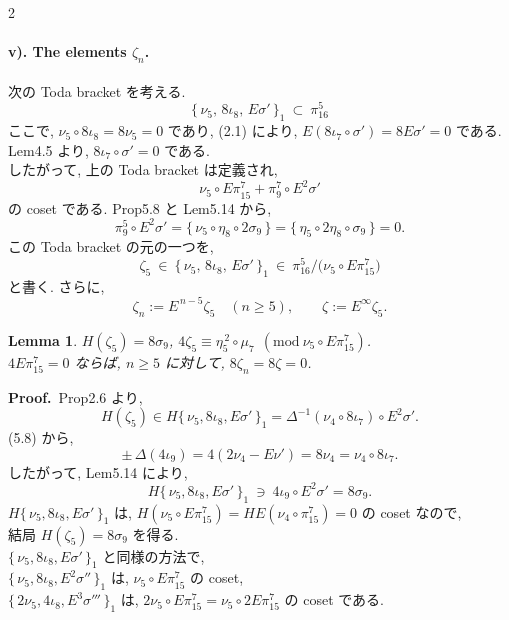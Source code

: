 \documentclass[10pt, leqno]{ltjsarticle}
\newcommand{\todai}[2][]{\{\,#2\,\}_{#1}}      %
\newcommand{\gen}[1]{\{\,#1\,\}}       %
\newcommand{\pit}[2]{\pi_{#1}^{#2}}
\numberwithin{equation}{section}
\theoremstyle{plain}
\newtheorem{lemma}[theorem]{Lemma}
\theoremstyle{definition}
\theoremstyle{remark}
\begin{document}
\begin{paracol}{2}

\paragraph{v). The elements \(\zeta_{n}\).}

次の Toda bracket を考える. 
\[
\todai[1]{\nu_{5},\,8\iota_{8},\,E\sigma'}
\ \subset\ \pi^{5}_{16}
\]
ここで, \(\nu_{5}\circ 8\iota_{8}=8\nu_{5}=0\) であり, 
(2.1) により, 
\(E(8\iota_{7}\circ \sigma')=8E\sigma'=0\) である. \\
Lem4.5 より, \(8\iota_{7}\circ \sigma'=0\) である. \\
したがって, 上の Toda bracket は定義され,
\[
\nu_{5}\circ E\pi^{7}_{15}+\pi^{7}_{9}\circ E^{2}\sigma'
\] 
の coset である. 
Prop5.8 と Lem5.14 から,
\[
\pi^{5}_{9}\circ E^{2}\sigma'
=\gen{\nu_{5}\circ \eta_{8}\circ 2\sigma_{9}}
=\gen{\eta_{5}\circ 2\eta_{8}\circ \sigma_{9}} = 0 .
\]
この Toda bracket の元の一つを,
\[
\zeta_{5}\ \in\ \todai[1]{\nu_{5},\,8\iota_{8},\,E\sigma'}
\ \in\ \pi^{5}_{16}/\bigl(\nu_{5}\circ E\pi^{7}_{15}\bigr)
\]
と書く. さらに,
\[
\zeta_{n}:=E^{\,n-5}\zeta_{5}\quad(n\ge5),\qquad
\zeta:=E^{\infty}\zeta_{5}.
\]

\begin{lemma}\label{lem:6.7}
\(H(\zeta_{5})=8\sigma_{9}\), \quad
\(4\zeta_{5}\equiv \eta_{5}^{\,2}\circ \mu_{7}\ \ (\mathrm{mod}\ \nu_{5}\circ E\pi^{7}_{15})\).\\
\(4E\pit{15}{7} = 0\) ならば, \(n\ge5\) に対して, \(8\zeta_n=8\zeta=0\).
\end{lemma}


\noindent
\textbf{Proof.}\
Prop2.6 より,
\[
H(\zeta_{5})\in H\todai[1]{\nu_{5},8\iota_{8},E\sigma'}
 = \Delta^{-1}(\nu_{4}\circ 8\iota_{7})\circ E^{2}\sigma' .
\]
(5.8) から,
\[
\pm\,\Delta(4\iota_{9})=4(2\nu_{4}-E\nu')
=8\nu_{4}=\nu_{4}\circ8\iota_{7} .
\]
したがって, Lem5.14 により, 
\[
H\todai[1]{\nu_{5},8\iota_{8},E\sigma'}\ \ni\ 
4\iota_9\circ E^2\sigma' = 8\sigma_9 .
\]
\(H\todai[1]{\nu_{5},8\iota_{8},E\sigma'}\) は,
\(H(\nu_{5}\circ E\pi^{7}_{15})=HE(\nu_{4}\circ \pi^{7}_{15})=0\)
の coset なので, \\
結局 \(H(\zeta_{5})=8\sigma_{9}\) を得る. \\
\(\todai[1]{\nu_5, 8\iota_8, E\sigma'}\) 
と同様の方法で, \\
\(\todai[1]{\nu_{5},8\iota_{8},E^{2}\sigma''}\) 
は, \(\nu_5\circ E\pit{15}{7}\) の coset, \\
\(\todai[1]{2\nu_{5},4\iota_{8},E^{3}\sigma'''}\)
は, \(2\nu_5\circ E\pit{15}{7} = \nu_5\circ2E\pit{15}{7}\) の coset である.


\end{paracol}
\end{document}
